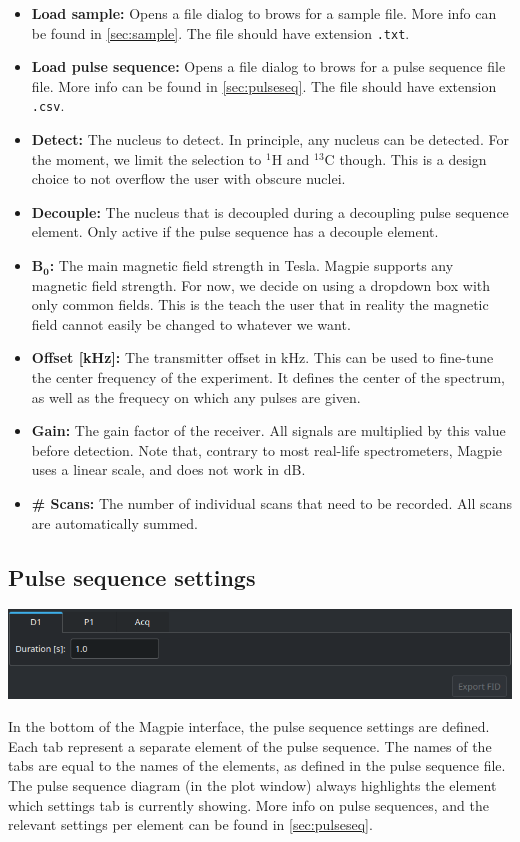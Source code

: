 \documentclass[11pt,a4paper]{article}
\begin{document}
\begin{itemize}
\item \textbf{Load sample:} Opens a file dialog to brows for a sample file. More info can be found in \autoref{sec:sample}. The file should have extension \texttt{.txt}.
\item \textbf{Load pulse sequence:} Opens a file dialog to brows for a pulse sequence file file. More info can be found in \autoref{sec:pulseseq}. The file should have extension \texttt{.csv}.
\item \textbf{Detect:} The nucleus to detect. In principle, any nucleus can be detected. For the moment, we limit the selection to $^1$H and $^{13}$C though. This is a design choice to not overflow the user with obscure nuclei.
\item \textbf{Decouple:} The nucleus that is decoupled during a decoupling pulse sequence element. Only active if the pulse sequence has a decouple element.
\item \textbf{B$_\mathbf{0}$:} The main magnetic field strength in Tesla. Magpie supports any magnetic field strength. For now, we decide on using a dropdown box with only common fields. This is the teach the user that in reality the magnetic field cannot easily be changed to whatever we want.
\item \textbf{Offset [kHz]:} The transmitter offset in kHz. This can be used to fine-tune the center frequency of the experiment. It defines the center of the spectrum, as well as the frequecy on which any pulses are given.
\item \textbf{Gain:} The gain factor of the receiver. All signals are multiplied by this value before detection. Note that, contrary to most real-life spectrometers, Magpie uses a linear scale, and does not work in dB.
\item \textbf{\# Scans:} The number of individual scans that need to be recorded. All scans are automatically summed.
\end{itemize}

\subsection{Pulse sequence settings}\label{sec:seq_settings}

\begin{center}
\includegraphics[width=0.9\linewidth]{images/Sequence_settings.png}
\end{center}
In the bottom of the Magpie interface, the pulse sequence settings are defined. Each tab represent a separate element of the pulse sequence. The names of the tabs are equal to the names of the elements, as defined in the pulse sequence file. The pulse sequence diagram (in the plot window) always highlights the element which settings tab is currently showing. More info on pulse sequences, and the relevant settings per element can be found in \autoref{sec:pulseseq}.
\end{document}
